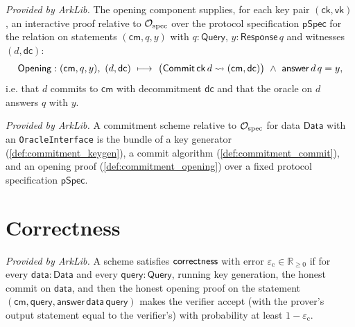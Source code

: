 \begin{definition}
  \label{def:commitment_opening}
  \mathlibok
  \textit{Provided by ArkLib.}
  The opening component supplies, for each key pair $(\mathsf{ck}, \mathsf{vk})$, an
  interactive proof relative to $\mathcal{O}_{\mathrm{spec}}$ over the protocol specification $\mathsf{pSpec}$
  for the relation on statements $(\mathsf{cm}, q, y)$ with $q : \mathsf{Query}$,
  $y : \mathsf{Response}\,q$ and witnesses $(d, \mathsf{dc})$:
  \[
    \mathsf{Opening} : (\mathsf{cm}, q, y),\ (d, \mathsf{dc}) \ \longmapsto\
      \bigl(\mathsf{Commit}\,\mathsf{ck}\,d \rightsquigarrow (\mathsf{cm}, \mathsf{dc})\bigr)
      \ \wedge\ \mathsf{answer}\,d\,q = y,
  \]
  i.e. that $d$ commits to $\mathsf{cm}$ with decommitment $\mathsf{dc}$ and that the
  oracle on $d$ answers $q$ with $y$.
\end{definition}

\begin{definition}
  \label{def:commitment_scheme}
  \mathlibok
  \textit{Provided by ArkLib.}
  A commitment scheme relative to $\mathcal{O}_{\mathrm{spec}}$ for data $\mathsf{Data}$ with an
  \texttt{OracleInterface} is the bundle of a key generator (\cref{def:commitment_keygen}),
  a commit algorithm (\cref{def:commitment_commit}), and an opening proof
  (\cref{def:commitment_opening}) over a fixed protocol specification $\mathsf{pSpec}$.
\end{definition}

\section{Correctness}

\begin{definition}[Correctness]
  \label{def:commitment_correctness}
  \mathlibok
  \textit{Provided by ArkLib.}
  A scheme satisfies $\mathsf{correctness}$ with error $\varepsilon_{\mathrm{c}} \in \mathbb{R}_{\ge 0}$
  if for every $\mathsf{data} : \mathsf{Data}$ and every $\mathsf{query} : \mathsf{Query}$,
  running key generation, the honest commit on $\mathsf{data}$, and then the honest opening
  proof on the statement $(\mathsf{cm}, \mathsf{query}, \mathsf{answer}\,\mathsf{data}\,
  \mathsf{query})$ makes the verifier accept (with the prover's output statement equal to the
  verifier's) with probability at least $1 - \varepsilon_{\mathrm{c}}$.
\end{definition}

